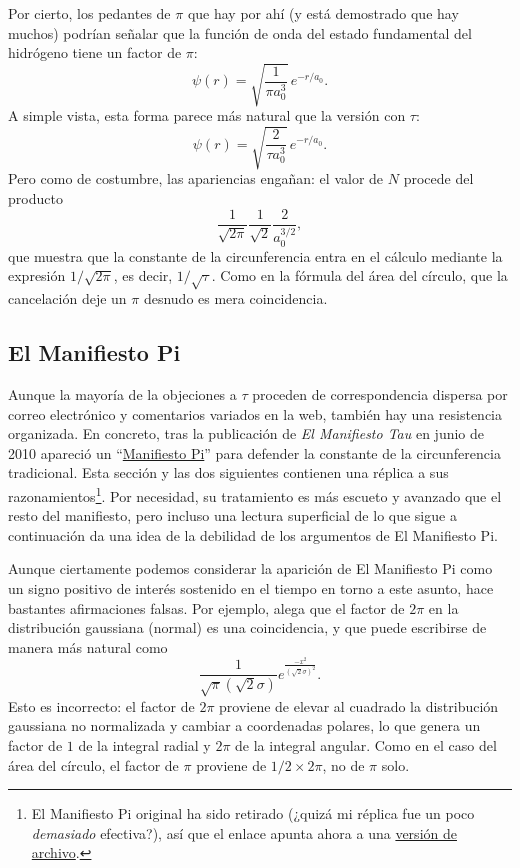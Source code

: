 Por cierto, los pedantes de $\pi$ que hay por ahí (y está demostrado que hay muchos) podrían señalar que la función de onda del estado fundamental del hidrógeno tiene un factor de $\pi$:
\[
\psi(r) = \sqrt{\frac{1}{\pi a_0^3}}\,e^{-r/a_0}.
\]
A simple vista, esta forma parece más natural que la versión con $\tau$:
\[
\psi(r) = \sqrt{\frac{2}{\tau a_0^3}}\,e^{-r/a_0}.
\]
Pero como de costumbre, las apariencias engañan: el valor de $N$ procede del producto
\[
\frac{1}{\sqrt{2\pi}} \frac{1}{\sqrt{2}} \frac{2}{a_0^{3/2}},
\]
que muestra que la constante de la circunferencia entra en el cálculo mediante la expresión $1/\sqrt{2\pi}$, es decir, $1/\sqrt{\tau}$. Como en la fórmula del área del círculo, que la cancelación deje un $\pi$ desnudo es mera coincidencia.



  \subsection{El Manifiesto Pi} %
  \label{sec:the_pi_manifesto_a_rebuttal}

Aunque la mayoría de la objeciones a $\tau$ proceden de correspondencia dispersa por correo electrónico y comentarios variados en la web, también hay una resistencia organizada. En concreto, tras la publicación de \emph{El Manifiesto Tau} en junio de 2010 apareció un ``\href{https://archive.md/VnJ2x}{Manifiesto Pi}'' para defender la constante de la circunferencia tradicional. Esta sección y las dos siguientes contienen una réplica a sus razonamientos\footnote{El Manifiesto Pi original ha sido retirado (¿quizá mi réplica fue un poco \emph{demasiado} efectiva?), así que el enlace apunta ahora a una \href{https://archive.md/VnJ2x}{versión de archivo}.}. Por necesidad, su tratamiento es más escueto y avanzado que el resto del manifiesto, pero incluso una lectura superficial de lo que sigue a continuación da una idea de la debilidad de los argumentos de El Manifiesto Pi.

Aunque ciertamente podemos considerar la aparición de El Manifiesto Pi como un signo positivo de interés sostenido en el tiempo en torno a este asunto, hace bastantes afirmaciones falsas. Por ejemplo, alega que el factor de $2\pi$ en la distribución gaussiana (normal) es una coincidencia, y que puede escribirse de manera más natural como
\[
\frac{1}{\sqrt\pi(\sqrt 2\sigma)}e^{\frac{-x^2}{(\sqrt 2\sigma)^2}}.
\]
Esto es incorrecto: el factor de $2\pi$ proviene de elevar al cuadrado la distribución gaussiana no normalizada y cambiar a coordenadas polares, lo que genera un factor de $1$ de la integral radial y $2\pi$ de la integral angular. Como en el caso del área del círculo, el factor de $\pi$ proviene de $1/2\times 2\pi$, no de $\pi$ solo.

